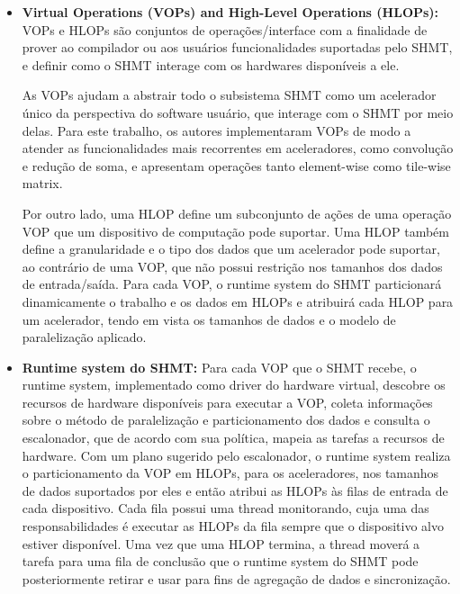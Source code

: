 \documentclass{article}
\begin{document}
\begin{itemize}
  \item \textbf{Virtual Operations (VOPs) and High-Level Operations (HLOPs):} VOPs e HLOPs são conjuntos de operações/interface com a finalidade de prover ao compilador ou aos usuários funcionalidades suportadas pelo SHMT, e definir como o SHMT interage com os hardwares disponíveis a ele.

As VOPs ajudam a abstrair todo o subsistema SHMT como um acelerador único da perspectiva do software usuário, que interage com o SHMT por meio delas. Para este trabalho, os autores implementaram VOPs de modo a atender as funcionalidades mais recorrentes em aceleradores, como convolução e redução de soma, e apresentam operações tanto element-wise como tile-wise matrix.

Por outro lado, uma HLOP define um subconjunto de ações de uma operação VOP que um dispositivo de computação pode suportar. Uma HLOP também define a granularidade e o tipo dos dados que um acelerador pode suportar, ao contrário de uma VOP, que não possui restrição nos tamanhos dos dados de entrada/saída. Para cada VOP, o runtime system do SHMT particionará dinamicamente o trabalho e os dados em HLOPs e atribuirá cada HLOP para um acelerador, tendo em vista os tamanhos de dados e o modelo de paralelização aplicado.
  
  \item \textbf{Runtime system do SHMT:} Para cada VOP que o SHMT recebe, o runtime system, implementado como driver do hardware virtual, descobre os recursos de hardware disponíveis para executar a VOP, coleta informações sobre o método de paralelização e particionamento dos dados e consulta o escalonador, que de acordo com sua política, mapeia as tarefas a recursos de hardware. Com um plano sugerido pelo escalonador, o runtime system realiza o particionamento da VOP em HLOPs, para os aceleradores, nos tamanhos de dados suportados por eles e então atribui as HLOPs às filas de entrada de cada dispositivo. Cada fila possui uma thread monitorando, cuja uma das responsabilidades é executar as HLOPs da fila sempre que o dispositivo alvo estiver disponível. Uma vez que uma HLOP termina, a thread moverá a tarefa para uma fila de conclusão que o runtime system do SHMT pode posteriormente retirar e usar para fins de agregação de dados e sincronização.
  

\end{itemize}
\end{document}
